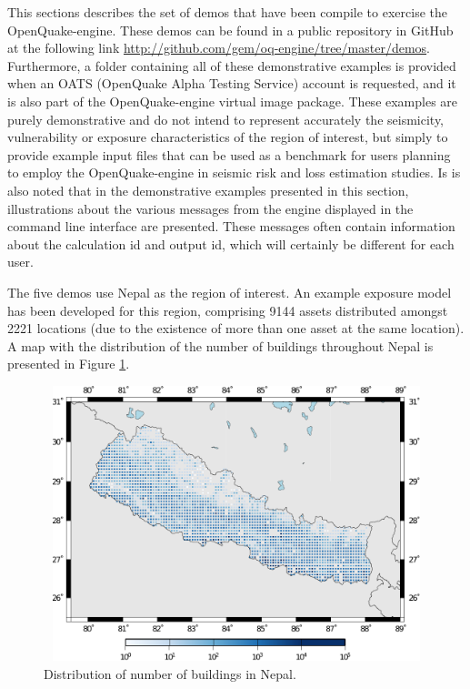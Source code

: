 This sections describes the set of demos that have been compile to exercise the OpenQuake-engine. These demos can be found in a public repository in GitHub at the following link \href{http://github.com/gem/oq-engine/tree/master/demos}{http://github.com/gem/oq-engine/tree/master/demos}. Furthermore, a folder containing all of these demonstrative examples is provided when an OATS (OpenQuake Alpha Testing Service) account is requested, and it is also part of the OpenQuake-engine virtual image package. These examples are purely demonstrative and do not intend to represent accurately the seismicity, vulnerability or exposure characteristics of the region of interest, but simply to provide example input files that can be used as a benchmark for users planning to employ the OpenQuake-engine in seismic risk and loss estimation studies. Is is also noted that in the demonstrative examples presented in this section, illustrations about the various messages from the engine displayed in the command line interface are presented. These messages often contain information about the calculation id and output id, which will certainly be different for each user.

The five demos use Nepal as the region of interest. An example \gls{exposure model} has been developed for this region, comprising 9144 assets distributed amongst 2221 locations (due to the existence of more than one \gls{asset} at the same location). A map with the distribution of the number of buildings throughout Nepal is presented in Figure \ref{fig:expNepal}.

\begin{figure}[ht]
\centering
\includegraphics[width=12cm,height=8cm]{./figures/risk/NepalExposure.pdf}
\caption{Distribution of number of buildings in Nepal.}
\label{fig:expNepal}
\end{figure}

